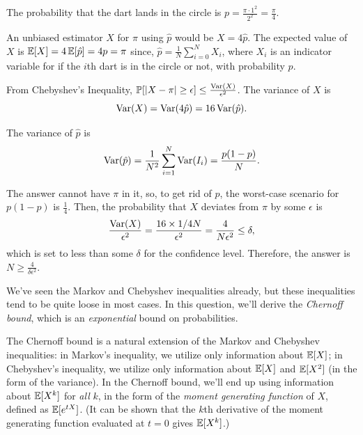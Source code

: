 \documentclass[11pt]{article}
\begin{document}
\begin{solution}

\begin{Parts}
    
\Part The probability that the dart lands in the circle is $p=
\frac{\pi \cdot 1^2}{2^2} = \frac{\pi}{4}$.

\Part An unbiased estimator $X$ for $\pi$ using $\hat{p}$ would be $X = 4\hat{p}$. 
The expected value of $X$ is $\operatorname{\mathbb{E}}[X] =  4 \operatorname{\mathbb{E}}[\hat{p}] =  4 p = \pi$ since, 
$\hat{p} = \frac{1}{N} \sum_{i=0}^{N} X_i$, where $X_i$ is an indicator variable
for if the $i$th dart is in the circle or not, with probability $p$. 

\Part From Chebyshev's Inequality, $\operatorname{\mathbb{P}}[|X-\pi| \geq \epsilon] \leq 
\frac{\operatorname{Var}(X)}{\epsilon^2}$. The variance of $X$ is 
\[
    \operatorname{Var}(X) = \operatorname{Var}(4\hat{p}) = 16 \operatorname{Var}(\hat{p}).
\]

The variance of $\hat{p}$ is
\[
    \operatorname{Var}(\hat{p}) = \frac{1}{N^2} \sum_{i=1}^{N} \operatorname{Var}(I_i) = \frac{p(1-p)}{N}.
\]

The answer cannot have $\pi$ in it, so, to get rid of $p$, the worst-case scenario
for $p(1-p)$ is $\frac{1}{4}$. Then, the probability that $X$ deviates from $\pi$ 
by some $\epsilon$ is
\[
    \frac{\operatorname{Var}(X)}{\epsilon^2} = \frac{16 \times 1 / 4N}{\epsilon^2} = \frac{4}{N\epsilon^2}
    \leq \delta,
\]
which is set to less than some $\delta$ for the confidence level. Therefore, the
answer is $N \geq \frac{4}{\delta \epsilon^2}$. 

\end{Parts}

\end{solution}


We've seen the Markov and Chebyshev inequalities already, but these inequalities 
tend to be quite loose in most cases. In this question, we'll derive the 
\emph{Chernoff bound}, which is an \emph{exponential} bound on probabilities.

The Chernoff bound is a natural extension of the Markov and Chebyshev 
inequalities: in Markov's inequality, we utilize only information about $\operatorname{\mathbb{E}}[X]$; 
in Chebyshev's inequality, we utilize only information about $\operatorname{\mathbb{E}}[X]$ and 
$\operatorname{\mathbb{E}}[X^2]$ (in the form of the variance). In the Chernoff bound, we'll end up 
using information about $\operatorname{\mathbb{E}}[X^k]$ for \emph{all} $k$, in the form of the 
\emph{moment generating function} of $X$, defined as $\operatorname{\mathbb{E}}[e^{tX}]$. (It can be 
shown that the $k$th derivative of the moment generating function evaluated at 
$t = 0$ gives $\operatorname{\mathbb{E}}[X^k]$.)
\end{document}
